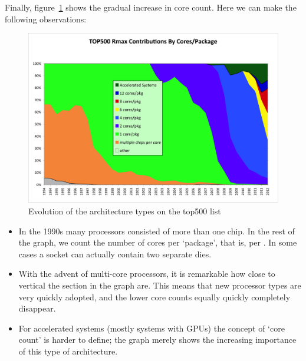 Finally, figure~\ref{fig:top500-cores} shows the gradual increase in
core count. Here we can make the following observations:
\begin{figure}[ht]
  \includegraphics[scale=.6]{graphics-public/top500/cores}
  \caption{Evolution of the architecture types on the top500 list}
  \label{fig:top500-cores}
\end{figure}
\begin{itemize}
\item In the 1990s many processors consisted of more than one chip.
  In the rest of the graph, we count the number of cores per
  `package', that is, per . In some cases a socket
  can actually contain two separate dies.
\item With the advent of multi-core processors, it is remarkable how
  close to vertical the section in the graph are. This means that new
  processor types are very quickly adopted, and the lower core counts
  equally quickly completely disappear.
\item For accelerated systems (mostly systems with \acp{GPU}) the
  concept of `core count' is harder to define; the graph merely shows
  the increasing importance of this type of architecture.
\end{itemize}
